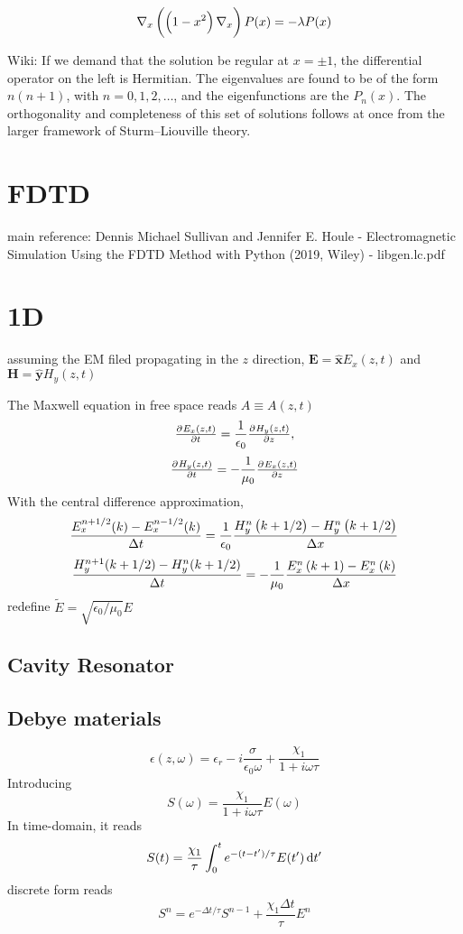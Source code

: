 \documentclass[a4paper,12pt]{book}
\renewcommand{\bf}[1]{\mathbf{#1}}
\newcommand{\grad}{\nabla}
\newcommand{\be}{\begin{equation}}
\newcommand{\ee}{\end{equation}}
\renewcommand{\bf}[1]{\mathbf{#1}}
\renewcommand{\bf}{\mathbf}
\begin{document}
\be
\grad_x \del{\del{1 - x^2} \grad_x} P(x) = -\lambda P(x)
\ee

Wiki: If we demand that the solution be regular at $x=\pm 1$, the differential operator on the left is Hermitian. The eigenvalues are found to be of the form $n(n + 1)$, with $n=0,1,2,\ldots$, and the eigenfunctions are the $P_n(x)$. The orthogonality and completeness of this set of solutions follows at once from the larger framework of Sturm–Liouville theory.

\section{FDTD}
main reference: Dennis Michael Sullivan and Jennifer E. Houle - Electromagnetic Simulation Using the FDTD Method with Python (2019, Wiley) - libgen.lc.pdf


\section{1D}

assuming the EM filed propagating in the $z$ direction, $\bf E = \hat{\bf x} E_x(z,t)$ and $  \bf H = \hat{\bf y} H_y(z,t)$

The Maxwell equation in free space reads $A \equiv A(z,t)$
\be
\pd{E_x(z,t)}{t} =  \frac{1}{\epsilon_0} \pd{H_y(z,t)}{z},
\ee
\be
\pd{H_y(z,t)}{t} =  -\frac{1}{\mu_0} \pd{E_x(z,t)}{z}
\ee
With the central difference approximation,
\be
\frac{E_x^{n + 1/2}(k)-E_x^{n - 1/2}(k)}{\Delta t} = \frac{1}{\epsilon_0} \frac{H_y^n\del{k + 1/2} - H_y^n\del{k + 1/2} }{\Delta x}
\ee
\be
\frac{H_y^{n+1}(k+1/2) - H_y^{n}(k+1/2)}{\Delta t} = -\frac{1}{\mu_0} \frac{E_x^n\del{k + 1} - E_x^n\del{k} }{\Delta x}
\ee
redefine $\tilde{E} = \sqrt{\epsilon_0/\mu_0} E $

\subsection{Cavity Resonator}

\subsection{Debye materials}
\be
\epsilon(z, \omega) = \epsilon_r - i \frac{\sigma}{\epsilon_0 \omega}  + \frac{\chi_1}{1 +i \omega \tau}
\ee
Introducing
\be
S(\omega) = \frac{\chi_1}{1 +i \omega \tau} E(\omega)
\ee
In time-domain, it reads
\be
S(t) = \frac{\chi_1}{\tau} \int_0^t e^{-(t-t')/\tau} E(t')\dif t'
\ee
discrete form reads
\be
S^n = e^{-\Delta t/\tau} S^{{n-1}} + \frac{\chi_1 \Delta t}{\tau}E^n
\ee
\end{document}
